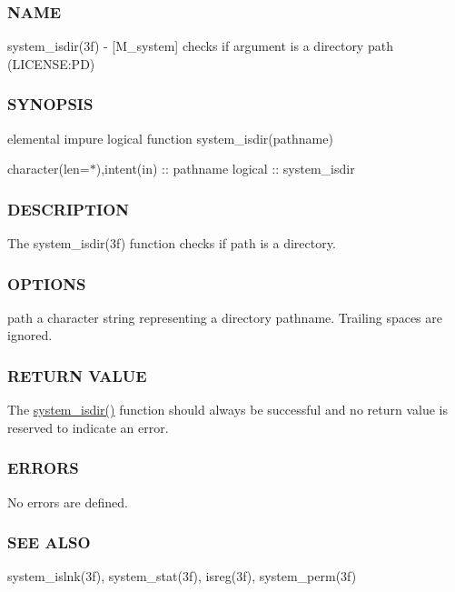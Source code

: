 \subsubsection*{N\+A\+ME}

system\+\_\+isdir(3f) -\/ \mbox{[}M\+\_\+system\mbox{]} checks if argument is a directory path (L\+I\+C\+E\+N\+SE\+:PD) 

\subsubsection*{S\+Y\+N\+O\+P\+S\+IS}

elemental impure logical function system\+\_\+isdir(pathname)

character(len=$\ast$),intent(in) \+:\+: pathname logical \+:\+: system\+\_\+isdir

\subsubsection*{D\+E\+S\+C\+R\+I\+P\+T\+I\+ON}

The system\+\_\+isdir(3f) function checks if path is a directory.

\subsubsection*{O\+P\+T\+I\+O\+NS}

path a character string representing a directory pathname. Trailing spaces are ignored.

\subsubsection*{R\+E\+T\+U\+RN V\+A\+L\+UE}

The \mbox{\hyperlink{namespacem__system_a7946ea976f399baff21caebcbe931f6d}{system\+\_\+isdir()}} function should always be successful and no return value is reserved to indicate an error.

\subsubsection*{E\+R\+R\+O\+RS}

No errors are defined.

\subsubsection*{S\+EE A\+L\+SO}

system\+\_\+islnk(3f), system\+\_\+stat(3f), isreg(3f), system\+\_\+perm(3f)

